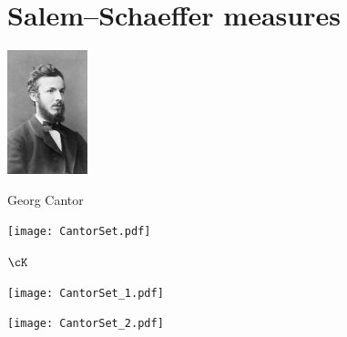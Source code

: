 
\section[Salem--Schaeffer measures]{Salem--Schaeffer measures}


\def\B{\mathscr{B}}
\def\Alg{\mathscr{A}}
\def\Mes{\mathscr{M}}
\def\Rajch{\mathscr{R}}
\def\W{\mathscr{W}}
\def\L{\mathscr{L}}
\def\T{\Hat T}
\def\CL{{\mathrm{CL}}}

\begin{frame}
\begin{center}
\includegraphics[height=36mm]{Georg_Cantor3.jpg}

Georg Cantor


\bigskip
\bigskip

\texttt{[image: CantorSet.pdf]}

$\cK$

\end{center}
\end{frame}


\begin{frame}
\begin{center}

\texttt{[image: CantorSet\_1.pdf]}

\end{center}
\end{frame}


\begin{frame}
\begin{center}

\texttt{[image: CantorSet\_2.pdf]}

\end{center}
\end{frame}


